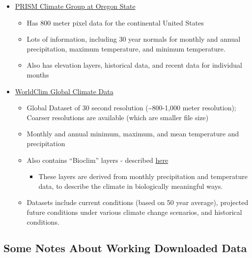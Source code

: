 \documentclass[12pt,]{article}
\begin{document}
\begin{itemize}
\itemsep1pt\parskip0pt
\item
  \href{http://www.prism.oregonstate.edu/}{PRISM Climate Group at Oregon
  State}

  \begin{itemize}
  \itemsep1pt\parskip0pt
  \item
    Has 800 meter pixel data for the continental United States
  \item
    Lots of information, including 30 year normals for monthly and
    annual precipitation, maximum temperature, and minimum temperature.
  \item
    Also has elevation layers, historical data, and recent data for
    individual months
  \end{itemize}
\item
  \href{http://www.worldclim.org/}{WorldClim Global Climate Data}

  \begin{itemize}
  \itemsep1pt\parskip0pt
  \item
    Global Dataset of 30 second resolution (\textasciitilde{}800-1,000
    meter resolution); Coarser resolutions are available (which are
    smaller file size)
  \item
    Monthly and annual minimum, maximum, and mean temperature and
    precipitation
  \item
    Also contains ``Bioclim'' layers - described
    \href{http://www.worldclim.org/bioclim}{here}

    \begin{itemize}
    \itemsep1pt\parskip0pt
    \item
      These layers are derived from monthly precipitation and
      temperature data, to describe the climate in biologically
      meaningful ways.
    \end{itemize}
  \item
    Datasets include current conditions (based on 50 year average),
    projected future conditions under various climate change scenarios,
    and historical conditions.
  \end{itemize}
\end{itemize}

\subsection{Some Notes About Working Downloaded
Data}\label{some-notes-about-working-downloaded-data}
\end{document}
